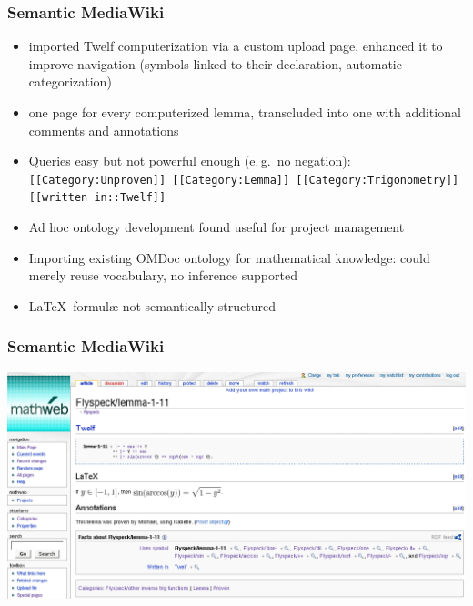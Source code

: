\documentclass[pdftex]{beamer}
\begin{document}
\begin{frame}
  \frametitle{Semantic MediaWiki}
  \begin{itemize}
  \item imported Twelf computerization via a custom upload page, enhanced it to
    improve navigation (symbols linked to their declaration, automatic
    categorization)
  \item one page for every computerized lemma, transcluded into one with
    additional comments and annotations
  \item Queries easy but not powerful enough (e.\,g.\ no negation):
    \texttt{[[Category:Unproven]] [[Category:Lemma]] [[Category:Trigonometry]]
      [[written in::Twelf]]}
  \item Ad hoc ontology development found useful for project management
  \item Importing existing OMDoc ontology for mathematical knowledge: could
    merely reuse vocabulary, no inference supported
  \item \LaTeX\ formulæ not semantically structured
  \end{itemize}
\end{frame}

\begin{frame}
  \frametitle{Semantic MediaWiki}
  \includegraphics[width=\textwidth]{images/smw-lemma}
\end{frame}
\end{document}
